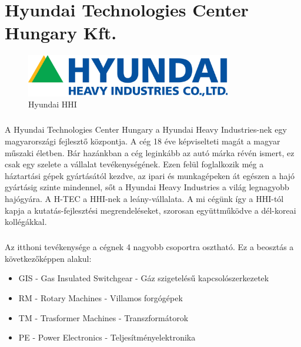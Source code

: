 \chapter{Hyundai Technologies Center Hungary Kft.}

\begin{figure}[h]
	\centering
	\includegraphics[width = 0.8\textwidth]{figures/hyundai_logo.png}
	\caption{Hyundai HHI} 
	\label{fig:hhi}
\end{figure}

\paragraph{}
A Hyundai Technologies Center Hungary a Hyundai Heavy Industries-nek egy magyarországi fejlesztő központja. A cég 18 éve képviselteti magát a magyar műszaki életben. Bár hazánkban a cég leginkább az autó márka révén ismert, ez csak egy szelete a vállalat tevékenységének. Ezen felül foglalkozik még a háztartási gépek gyártásától kezdve, az ipari és munkagépeken át egészen a hajó gyártásig szinte mindennel, sőt a Hyundai Heavy Industries a világ legnagyobb hajógyára.  A H-TEC a HHI-nek a leány-vállalata. A mi cégünk így a HHI-tól kapja a kutatás-fejlesztési megrendeléseket, szorosan együttműködve a dél-koreai kollégákkal.

\paragraph{}
Az itthoni tevékenysége a cégnek 4 nagyobb csoportra osztható. Ez a beosztás a következőképpen alakul:


\begin{itemize}
	\item{GIS - Gas Insulated Switchgear - Gáz szigetelésű kapcsolószerkezetek}
	\item{RM - Rotary Machines - Villamos forgógépek}
	\item{TM - Trasformer Machines - Transzformátorok}
	\item{PE - Power Electronics - Teljesítményelektronika}
\end{itemize}




